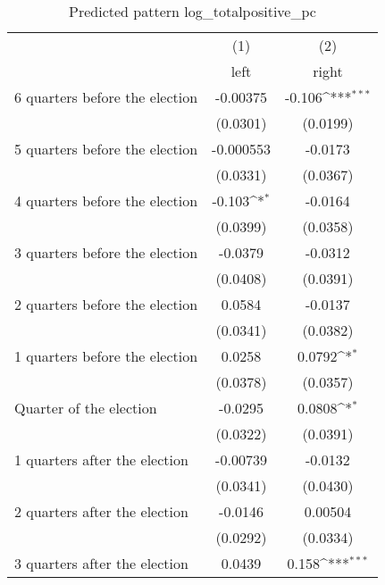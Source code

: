 \begin{table}[htbp]\centering
\def\sym#1{\ifmmode^{#1}\else\(^{#1}\)\fi}
\caption{Predicted pattern log\_totalpositive\_pc}
\begin{tabular}{l*{2}{c}}
\hline\hline
                    &\multicolumn{1}{c}{(1)}&\multicolumn{1}{c}{(2)}\\
                    &\multicolumn{1}{c}{left}&\multicolumn{1}{c}{right}\\
\hline
 6 quarters before the election&    -0.00375         &      -0.106\sym{***}\\
                    &    (0.0301)         &    (0.0199)         \\
[1em]
 5 quarters before the election&   -0.000553         &     -0.0173         \\
                    &    (0.0331)         &    (0.0367)         \\
[1em]
 4 quarters before the election&      -0.103\sym{*}  &     -0.0164         \\
                    &    (0.0399)         &    (0.0358)         \\
[1em]
 3 quarters before the election&     -0.0379         &     -0.0312         \\
                    &    (0.0408)         &    (0.0391)         \\
[1em]
 2 quarters before the election&      0.0584         &     -0.0137         \\
                    &    (0.0341)         &    (0.0382)         \\
[1em]
 1 quarters before the election&      0.0258         &      0.0792\sym{*}  \\
                    &    (0.0378)         &    (0.0357)         \\
[1em]
Quarter of the election&     -0.0295         &      0.0808\sym{*}  \\
                    &    (0.0322)         &    (0.0391)         \\
[1em]
 1 quarters after the election&    -0.00739         &     -0.0132         \\
                    &    (0.0341)         &    (0.0430)         \\
[1em]
 2 quarters after the election&     -0.0146         &     0.00504         \\
                    &    (0.0292)         &    (0.0334)         \\
[1em]
 3 quarters after the election&      0.0439         &       0.158\sym{***}\\

\end{tabular}
\end{table}
